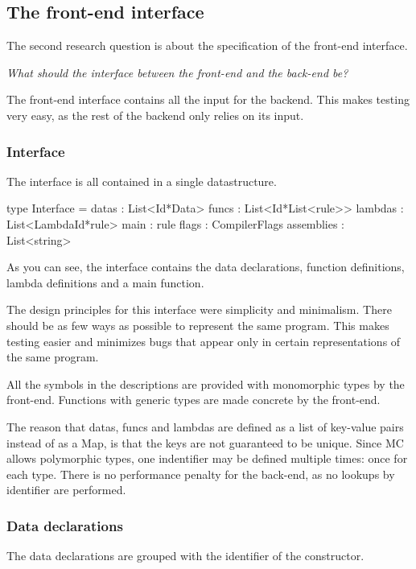 \subsection{The front-end interface}
The second research question is about the specification of the front-end interface.

\textit{What should the interface between the front-end and the back-end be?}

The front-end interface contains all the input for the backend.
This makes testing very easy, as the rest of the backend only relies on its input.

\subsubsection{Interface}
The interface is all contained in a single datastructure.

\begin{FS}
type Interface = {
  datas      : List<Id*Data>
  funcs      : List<Id*List<rule>>
  lambdas    : List<LambdaId*rule>
  main       : rule
  flags      : CompilerFlags
  assemblies : List<string> 
}
\end{FS}

As you can see, the interface contains the data declarations, function definitions, lambda definitions and a main function.

The design principles for this interface were simplicity and minimalism.
There should be as few ways as possible to represent the same program.
This makes testing easier and minimizes bugs that appear only in certain representations of the same program.

All the symbols in the descriptions are provided with monomorphic types by the front-end.
Functions with generic types are made concrete by the front-end.

The reason that datas, funcs and lambdas are defined as a list of key-value pairs instead of as a Map, is that the keys are not guaranteed to be unique.
Since MC allows polymorphic types, one indentifier may be defined multiple times: once for each type.
There is no performance penalty for the back-end, as no lookups by identifier are performed.

\subsubsection{Data declarations}
The data declarations are grouped with the identifier of the constructor.

